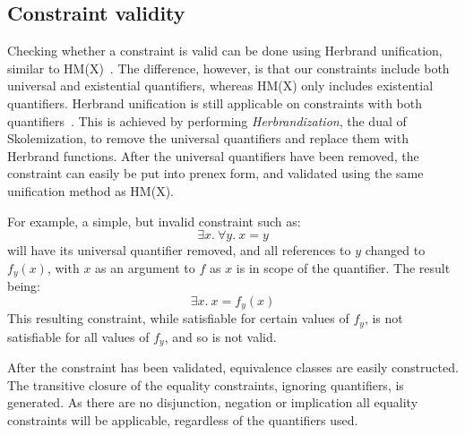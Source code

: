 \subsection{Constraint validity}

Checking whether a constraint is valid can be done using Herbrand unification, similar to HM(X)~\cite{odersky1999type}.
The difference, however, is that our constraints include both universal and existential quantifiers, whereas HM(X) only includes existential quantifiers.
Herbrand unification is still applicable on constraints with both quantifiers~\cite{buss1995herbrand}.
This is achieved by performing \emph{Herbrandization}, the dual of Skolemization, to remove the universal quantifiers and replace them with Herbrand functions.
After the universal quantifiers have been removed, the constraint can easily be put into prenex form, and validated using the same unification method as HM(X).

For example, a simple, but invalid constraint such as:
\[ \exists x.\ \forall y.\ x = y \]
will have its universal quantifier removed, and all references to $y$ changed to $f_y(x)$, with $x$ as an argument to $f$ as $x$ is in scope of the quantifier.
The result being:
\[ \exists x.\ x = f_y(x) \]
This resulting constraint, while satisfiable for certain values of $f_y$, is not satisfiable for all values of $f_y$, and so is not valid.

After the constraint has been validated, equivalence classes are easily constructed.
The transitive closure of the equality constraints, ignoring quantifiers, is generated.
As there are no disjunction, negation or implication all equality constraints will be applicable, regardless of the quantifiers used.



